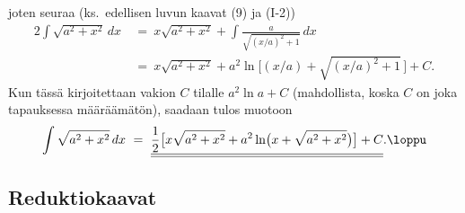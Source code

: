 joten seuraa (ks.\ edellisen luvun kaavat (9) ja (I-2))
\begin{align*}
2\int \sqrt{a^2+x^2}\,dx\ &=\ x\sqrt{a^2+x^2} + \int \frac{a}{\sqrt{(x/a)^2+1}}\,dx \\
                          &=\ x\sqrt{a^2+x^2} + a^2\ln\bigl[(x/a)+\sqrt{(x/a)^2+1}\,\bigr]+C.
\end{align*}
Kun tässä kirjoitettaan vakion $C$ tilalle $a^2\ln a+C$ (mahdollista, koska $C$ on joka 
tapauksessa määräämätön), saadaan tulos muotoon
\[
\int \sqrt{a^2+x^2}\,dx\ 
  =\ \underline{\underline{\frac{1}{2}\bigl[x\sqrt{a^2+x^2} 
                + a^2\ln\bigl(x + \sqrt{a^2+x^2}\bigr)\bigr]+C}}. \loppu
\]

\subsection{Reduktiokaavat}

